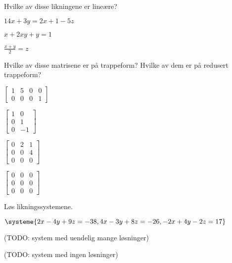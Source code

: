 \documentclass[11pt, a4paper, norsk]{NTNUoving}
\begin{document}
\begin{oppgave}
Hvilke av disse likningene er lineære?
\begin{punkt}
$14x + 3y = 2x + 1 - 5z$
\end{punkt}
\begin{punkt}
$x + 2xy + y = 1$
\end{punkt}
\begin{punkt}
$\frac{x + y}{2} = z$
\end{punkt}
\end{oppgave}


\begin{oppgave}
Hvilke av disse matrisene er på trappeform?  Hvilke av dem er på
redusert trappeform?
\begin{punkt}
$
\begin{bmatrix}
1 & 5 & 0 & 0 \\
0 & 0 & 0 & 1
\end{bmatrix}
$
\end{punkt}
\begin{punkt}
$
\begin{bmatrix}
1 & 0 \\
0 & 1 \\
0 & -1
\end{bmatrix}
$
\end{punkt}
\begin{punkt}
$
\begin{bmatrix}
0 & 2 & 1 \\
0 & 0 & 4 \\
0 & 0 & 0
\end{bmatrix}
$
\end{punkt}
\begin{punkt}
$
\begin{bmatrix}
0 & 0 & 0 \\
0 & 0 & 0 \\
0 & 0 & 0
\end{bmatrix}
$
\end{punkt}
\end{oppgave}


\begin{oppgave}
Løs likningssystemene.
\begin{punkt}
$
\systeme{
  2x - 4y + 9z = -38,
  4x - 3y + 8z = -26,
 -2x + 4y - 2z =  17
}
$
\end{punkt}
\begin{punkt}
(TODO: system med uendelig mange løsninger)
\end{punkt}
\begin{punkt}
(TODO: system med ingen løsninger)
\end{punkt}
\end{oppgave}
\end{document}
